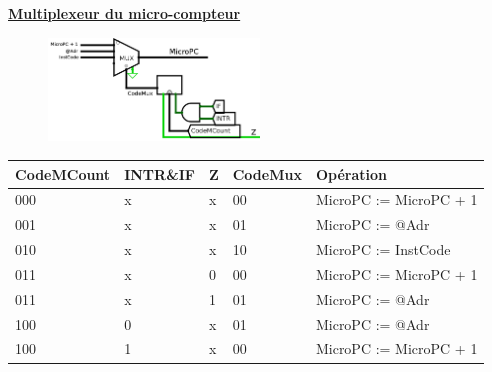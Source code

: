 \documentclass{standalone}
\begin{document}
\begin{minipage}{4.5in}

\textbf{\underline{Multiplexeur du micro-compteur}}
\begin{figure}
\includegraphics[width=0.5\textwidth]{mucount.png}
\end{figure}
\renewcommand{\arraystretch}{1.2}
\begin{tabular}{@{}lll||ll@{}}
\toprule
 CodeMCount & INTR\&IF & Z & CodeMux & Opération \\
\toprule
000 &  x & x & 00 & MicroPC := MicroPC + 1\\
001 &  x & x & 01 & MicroPC := @Adr\\
010 &  x & x & 10 & MicroPC := InstCode \\
011 &  x & 0 & 00 & MicroPC := MicroPC + 1 \\
011 &  x & 1 & 01 & MicroPC := @Adr \\
100 &  0 & x & 01 & MicroPC := @Adr \\
100 &  1 & x & 00 & MicroPC := MicroPC + 1 
\end{tabular}

\end{minipage}
\end{document}

